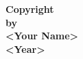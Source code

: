 \null
\vspace*{1.5truein}
\begin{center}
\textbf{Copyright\\[3em]
by\\[3em]
<Your Name>\\[3em]
<Year>}
\end{center}
\thispagestyle{empty}
\newpage